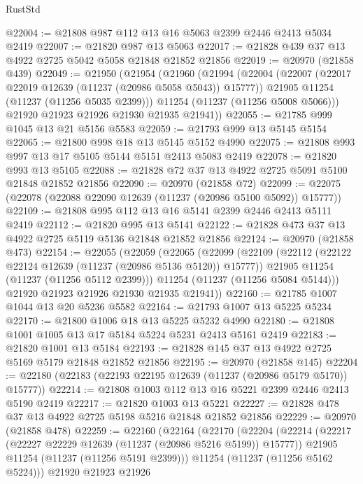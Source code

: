 \begin{lexlean}{RustStd}
\begin{coremodule}
@22004 := @21808 @987 @112 @13 @16 @5063 @2399 @2446 @2413 @5034 @2419
@22007 := @21820 @987 @13 @5063
@22017 := @21828 @439 @37 @13 @4922 @2725 @5042 @5058 @21848 @21852 @21856
@22019 := @20970 (@21858 @439)
@22049 := @21950
    (@21954
      (@21960
        (@21994
          (@22004
            (@22007 (@22017 @22019 @12639 (@11237 (@20986 @5058 @5043)) @15777))
            @21905
            @11254
            (@11237 (@11256 @5035 @2399)))
          @11254
          (@11237 (@11256 @5008 @5066)))
        @21920
        @21923
        @21926
        @21930
        @21935
        @21941))
@22055 := @21785 @999 @1045 @13 @21 @5156 @5583
@22059 := @21793 @999 @13 @5145 @5154
@22065 := @21800 @998 @18 @13 @5145 @5152 @4990
@22075 := @21808 @993 @997 @13 @17 @5105 @5144 @5151 @2413 @5083 @2419
@22078 := @21820 @993 @13 @5105
@22088 := @21828 @72 @37 @13 @4922 @2725 @5091 @5100 @21848 @21852 @21856
@22090 := @20970 (@21858 @72)
@22099 := @22075 (@22078 (@22088 @22090 @12639 (@11237 (@20986 @5100 @5092)) @15777))
@22109 := @21808 @995 @112 @13 @16 @5141 @2399 @2446 @2413 @5111 @2419
@22112 := @21820 @995 @13 @5141
@22122 := @21828 @473 @37 @13 @4922 @2725 @5119 @5136 @21848 @21852 @21856
@22124 := @20970 (@21858 @473)
@22154 := @22055
    (@22059
      (@22065
        (@22099
          (@22109
            (@22112 (@22122 @22124 @12639 (@11237 (@20986 @5136 @5120)) @15777))
            @21905
            @11254
            (@11237 (@11256 @5112 @2399)))
          @11254
          (@11237 (@11256 @5084 @5144)))
        @21920
        @21923
        @21926
        @21930
        @21935
        @21941))
@22160 := @21785 @1007 @1044 @13 @20 @5236 @5582
@22164 := @21793 @1007 @13 @5225 @5234
@22170 := @21800 @1006 @18 @13 @5225 @5232 @4990
@22180 := @21808 @1001 @1005 @13 @17 @5184 @5224 @5231 @2413 @5161 @2419
@22183 := @21820 @1001 @13 @5184
@22193 := @21828 @145 @37 @13 @4922 @2725 @5169 @5179 @21848 @21852 @21856
@22195 := @20970 (@21858 @145)
@22204 := @22180 (@22183 (@22193 @22195 @12639 (@11237 (@20986 @5179 @5170)) @15777))
@22214 := @21808 @1003 @112 @13 @16 @5221 @2399 @2446 @2413 @5190 @2419
@22217 := @21820 @1003 @13 @5221
@22227 := @21828 @478 @37 @13 @4922 @2725 @5198 @5216 @21848 @21852 @21856
@22229 := @20970 (@21858 @478)
@22259 := @22160
    (@22164
      (@22170
        (@22204
          (@22214
            (@22217 (@22227 @22229 @12639 (@11237 (@20986 @5216 @5199)) @15777))
            @21905
            @11254
            (@11237 (@11256 @5191 @2399)))
          @11254
          (@11237 (@11256 @5162 @5224)))
        @21920
        @21923
        @21926

\end{coremodule}
\end{lexlean}
